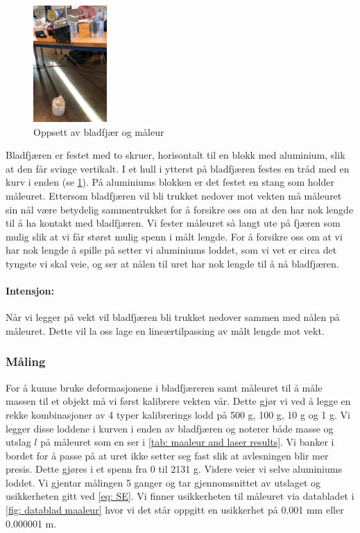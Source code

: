 \documentclass[reprint,norsk,notitlepage]{revtex4-2}
\begin{document}
\begin{figure}[h!]
  \centering
  \includegraphics[width = 0.25\textwidth]{fig/maaleur_oppsett.png}
  \caption{Oppsett av bladfjær og måleur}
  \label{fig: oppsett maaleur}
\end{figure}

Bladfjæren er festet med to skruer, horisontalt til en blokk med aluminium, slik at den får svinge vertikalt. I et hull i ytterst på bladfjæren festes en tråd med en kurv i enden (se \cref{fig: oppsett maaleur}). På aluminiums blokken er det festet en stang som holder måleuret. Ettersom bladfjæren vil bli trukket nedover mot vekten må måleuret sin nål være betydelig sammentrukket for å forsikre oss om at den har nok lengde til å ha kontakt med bladfjæren. Vi fester måleuret så langt ute på fjæren som mulig slik at vi får størst mulig spenn i målt lengde. For å forsikre oss om at vi har nok lengde å spille på setter vi aluminiums loddet, som vi vet er circa det tyngste vi skal veie, og ser at nålen til uret har nok lengde til å nå bladfjæren.
\paragraph{\bf Intensjon:}
Når vi legger på vekt vil bladfjæren bli trukket nedover sammen med nålen på måleuret. Dette vil la oss lage en lineærtilpassing av målt lengde mot vekt. 


\subsubsection{Måling} \label{ssec: measurement maaleur}
For å kunne bruke deformasjonene i bladfjæreren samt måleuret til å måle massen til et objekt må vi først kalibrere vekten vår. Dette gjør vi ved å legge en rekke kombinasjoner av 4 typer kalibrerings lodd på 500 g, 100 g, 10 g og 1 g. Vi legger disse loddene i kurven i enden av bladfjæren og noterer både masse og utslag $l$ på måleuret som en ser i \cref{tab: maaleur and laser results}. Vi banker i bordet for å passe på at uret ikke setter seg fast slik at avlesningen blir mer presis. Dette gjøres i et spenn fra 0 til 2131 g. 
Videre veier vi selve aluminiums loddet. Vi gjentar målingen 5 ganger og tar gjennomsnittet av utslaget og usikkerheten gitt ved \cref{eq: SE}. Vi finner usikkerheten til måleuret via databladet i \cref{fig: datablad maaleur} hvor vi det står oppgitt en usikkerhet på 0.001 mm eller 0.000001 m.
\end{document}
